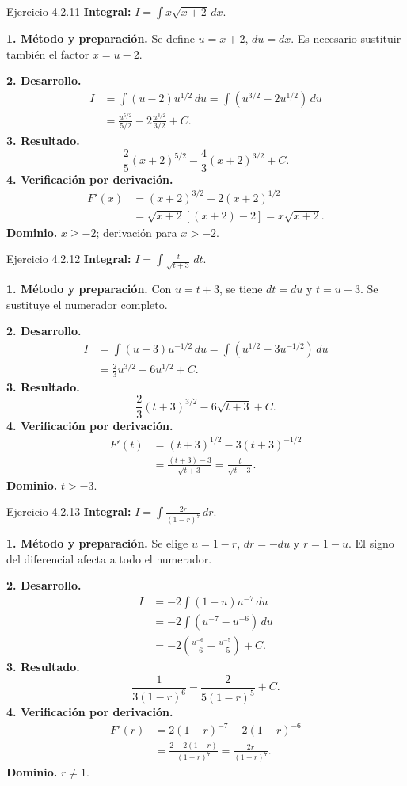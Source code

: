 \begin{examplebox}{Ejercicio 4.2.11}
\textbf{Integral:} $\displaystyle I=\int x\sqrt{x+2}\,dx$.

\textbf{1. Método y preparación.} Se define $u=x+2$, $du=dx$. Es necesario sustituir también el factor $x=u-2$.

\textbf{2. Desarrollo.}
\begin{align*}
I&=\int(u-2)u^{1/2}\,du=\int(u^{3/2}-2u^{1/2})\,du\\&=\frac{u^{5/2}}{5/2}-2\frac{u^{3/2}}{3/2}+C.
\end{align*}
\textbf{3. Resultado.}
\[
\frac25(x+2)^{5/2}-\frac43(x+2)^{3/2}+C.
\]
\textbf{4. Verificación por derivación.}
\begin{align*}
F'(x)&=(x+2)^{3/2}-2(x+2)^{1/2}\\&=\sqrt{x+2}[(x+2)-2]=x\sqrt{x+2}.
\end{align*}
\textbf{Dominio.} $x\ge-2$; derivación para $x>-2$.
\end{examplebox}

\begin{examplebox}{Ejercicio 4.2.12}
\textbf{Integral:} $\displaystyle I=\int \frac{t}{\sqrt{t+3}}\,dt$.

\textbf{1. Método y preparación.} Con $u=t+3$, se tiene $dt=du$ y $t=u-3$. Se sustituye el numerador completo.

\textbf{2. Desarrollo.}
\begin{align*}
I&=\int(u-3)u^{-1/2}\,du=\int(u^{1/2}-3u^{-1/2})\,du\\&=\frac23u^{3/2}-6u^{1/2}+C.
\end{align*}
\textbf{3. Resultado.}
\[
\frac23(t+3)^{3/2}-6\sqrt{t+3}+C.
\]
\textbf{4. Verificación por derivación.}
\begin{align*}
F'(t)&=(t+3)^{1/2}-3(t+3)^{-1/2}\\&=\frac{(t+3)-3}{\sqrt{t+3}}=\frac t{\sqrt{t+3}}.
\end{align*}
\textbf{Dominio.} $t>-3$.
\end{examplebox}

\begin{examplebox}{Ejercicio 4.2.13}
\textbf{Integral:} $\displaystyle I=\int \frac{2r}{(1-r)^7}\,dr$.

\textbf{1. Método y preparación.} Se elige $u=1-r$, $dr=-du$ y $r=1-u$. El signo del diferencial afecta a todo el numerador.

\textbf{2. Desarrollo.}
\begin{align*}
I&=-2\int(1-u)u^{-7}\,du\\&=-2\int(u^{-7}-u^{-6})\,du\\&=-2\left(\frac{u^{-6}}{-6}-\frac{u^{-5}}{-5}\right)+C.
\end{align*}
\textbf{3. Resultado.}
\[
\frac1{3(1-r)^6}-\frac2{5(1-r)^5}+C.
\]
\textbf{4. Verificación por derivación.}
\begin{align*}
F'(r)&=2(1-r)^{-7}-2(1-r)^{-6}\\&=\frac{2-2(1-r)}{(1-r)^7}=\frac{2r}{(1-r)^7}.
\end{align*}
\textbf{Dominio.} $r\ne1$.
\end{examplebox}


